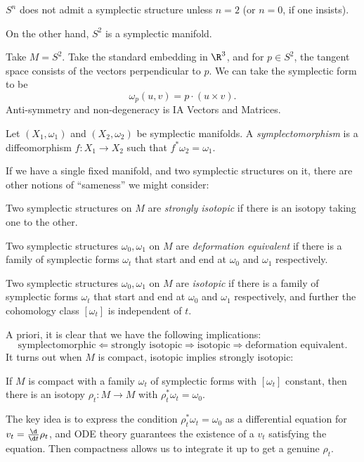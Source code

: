 \documentclass[a4paper]{article}
\begin{document}
\begin{eg}
  $S^n$ does not admit a symplectic structure unless $n = 2$ (or $n = 0$, if one insists).
\end{eg}

On the other hand, $S^2$ is a symplectic manifold.
\begin{eg}
  Take $M = S^2$. Take the standard embedding in $\R^3$, and for $p \in S^2$, the tangent space consists of the vectors perpendicular to $p$. We can take the symplectic form to be
  \[
    \omega_p(u, v) = p \cdot (u \times v).
  \]
  Anti-symmetry and non-degeneracy is IA Vectors and Matrices.
\end{eg}

\begin{defi}[Symplectomorphism]
  Let $(X_1, \omega_1)$ and $(X_2, \omega_2)$ be symplectic manifolds. A \emph{symplectomorphism} is a diffeomorphism $f: X_1 \to X_2$ such that $f^* \omega_2 = \omega_1$.
\end{defi}

If we have a single fixed manifold, and two symplectic structures on it, there are other notions of ``sameness'' we might consider:
\begin{defi}
  Two symplectic structures on $M$ are \emph{strongly isotopic} if there is an isotopy taking one to the other.
\end{defi}

\begin{defi}
  Two symplectic structures $\omega_0, \omega_1$ on $M$ are \emph{deformation equivalent} if there is a family of symplectic forms $\omega_t$ that start and end at $\omega_0$ and $\omega_1$ respectively.
\end{defi}

\begin{defi}[Isotopic]
  Two symplectic structures $\omega_0, \omega_1$ on $M$ are \emph{isotopic} if there is a family of symplectic forms $\omega_t$ that start and end at $\omega_0$ and $\omega_1$ respectively, and further the cohomology class $[\omega_t]$ is independent of $t$.
\end{defi}

A priori, it is clear that we have the following implications:
\[
  \text{symplectomorphic} \Leftarrow \text{strongly isotopic} \Rightarrow \text{isotopic} \Rightarrow \text{deformation equivalent}.
\]
It turns out when $M$ is compact, isotopic implies strongly isotopic:
\begin{thm}[Moser]
  If $M$ is compact with a family $\omega_t$ of symplectic forms with $[\omega_t]$ constant, then there is an isotopy $\rho_t: M \to M$ with $\rho_t^* \omega_t = \omega_0$.
\end{thm}
The key idea is to express the condition $\rho_t^* \omega_t = \omega_0$ as a differential equation for $v_t = \frac{\d}{\d t} \rho_t$, and ODE theory guarantees the existence of a $v_t$ satisfying the equation. Then compactness allows us to integrate it up to get a genuine $\rho_t$.
\end{document}
